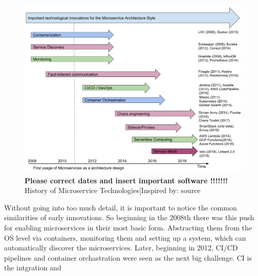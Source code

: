 \begin{figure}[ht]
    \centering
    \includegraphics[width=150mm]{figures/history-diagram.png}
    \caption{\textbf{Please correct dates and insert important software !!!!!!!} History of Microservice Technologies[Inspired by: source }
    \label{fig:history-micro}
\end{figure}
Without going into too much detail, it is important to notice the common similarities of early innovations. So beginning in the 2008th there was this push for enabling microservices in their most basic form. Abstracting them from the OS level via containers, monitoring them and setting up a system, which can automatically discover the microservices. Later, beginning in 2012, CI/CD pipelines and container orchastration were seen as the next big challenge. CI is the intgration and 